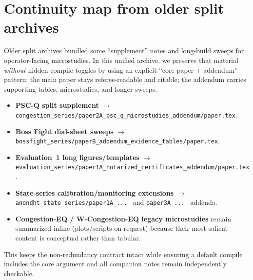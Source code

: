 \documentclass[11pt]{article}
\begin{document}
\section{Continuity map from older split archives}
Older split archives bundled some ``supplement'' notes and long-build sweeps for operator-facing microstudies.
In this unified archive, we preserve that material \emph{without} hidden compile toggles by using an explicit ``core paper + addendum'' pattern:
the main paper stays referee-readable and citable; the addendum carries supporting tables, microstudies, and longer sweeps.

\begin{itemize}[leftmargin=*]
\item \textbf{PSC-Q split supplement} $\rightarrow$ \texttt{congestion\_series/paper2A\_psc\_q\_microstudies\_addendum/paper.tex}.
\item \textbf{Boss Fight dial-sheet sweeps} $\rightarrow$ \texttt{bossfight\_series/paperB\_addendum\_evidence\_tables/paper.tex}.
\item \textbf{Evaluation~1 long figures/templates} $\rightarrow$ \texttt{evaluation\_series/paper1A\_notarized\_certificates\_addendum/paper.tex}.
\item \textbf{State-series calibration/monitoring extensions} $\rightarrow$ \texttt{anondht\_state\_series/paper1A\_...\ } and \texttt{paper3A\_...\ } addenda.
\item \textbf{Congestion-EQ / W-Congestion-EQ legacy microstudies} remain summarized inline (plots/scripts on request) because their most salient content is conceptual rather than tabular.
\end{itemize}

This keeps the non-redundancy contract intact while ensuring a default compile includes the core argument and all companion notes remain independently checkable.
\end{document}
